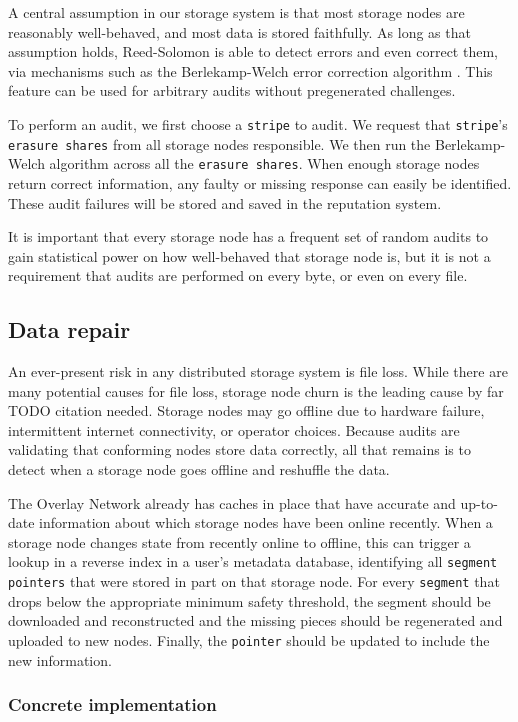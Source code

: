 \documentclass[a4paper,10pt]{article} \usepackage[utf8]{inputenc}
\newcommand{\x}[1]{{\tt #1}} \newcommand{\code}[1]{{\tt #1}}
\newcommand{\todo}[1]{{\color{red} TODO #1}}
\begin{document}
A central assumption in our storage system is that most storage nodes are
reasonably well-behaved, and most data is stored faithfully. As long as that
assumption holds, Reed-Solomon is able to detect errors and even correct them,
via mechanisms such as the Berlekamp-Welch error correction algorithm \cite{bw}.
This feature can be used for arbitrary audits without pregenerated challenges.

To perform an audit, we first choose a \x{stripe} to audit. We request that
\x{stripe}'s \x{erasure shares} from all storage nodes responsible. We then run
the Berlekamp-Welch algorithm across all the \x{erasure shares}. When enough
storage nodes return correct information, any faulty or missing response can
easily be identified. These audit failures will be stored and saved in the
reputation system.

It is important that every storage node has a frequent set of random audits to
gain statistical power on how well-behaved that storage node is, but it is not
a requirement that audits are performed on every byte, or even on every file.

\subsection{Data repair}

An ever-present risk in any distributed storage system is file loss. While there
are many potential causes for file loss, storage node churn is the leading
cause by far \todo{citation needed}. Storage nodes may go offline due to
hardware failure, intermittent internet connectivity, or operator choices.
Because audits are validating that conforming nodes store data correctly, all
that remains is to detect when a storage node goes offline and reshuffle the
data.

The Overlay Network already has caches in place that have accurate and
up-to-date information about which storage nodes have been online recently.
When a storage node changes state from recently online to offline, this can
trigger a lookup in a reverse index in a user's metadata database, identifying
all \x{segment} \x{pointers} that were stored in part on that storage node.
For every \x{segment} that drops below the appropriate minimum safety
threshold, the segment should be downloaded and reconstructed and the missing
pieces should be regenerated and uploaded to new nodes. Finally, the
\x{pointer} should be updated to include the new information.

\subsubsection{Concrete implementation}
\end{document}
